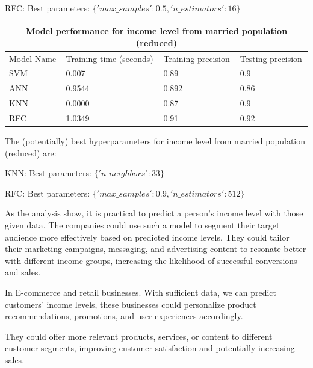 RFC:
Best parameters: $\{'max\_samples': 0.5, 'n\_estimators': 16\}$

\begin{table}[h!]
    \centering
    \begin{tabular}{ |p{3cm}||p{5cm}|p{4cm}|p{4cm}|}
    \hline
    \multicolumn{4}{|c|}{Model performance for income level from married population (reduced)} 
     \\
    \hline
    Model Name& Training time (seconds)& Training precision & Testing precision \\
    \hline
    SVM &0.007   &0.89&0.9\\
    ANN &0.9544  & 0.892 & 0.86\\
    KNN &0.0000 & 0.87&0.9\\
    RFC &1.0349 & 0.91&0.92\\
    \hline
   \end{tabular}
\end{table}

The (potentially) best hyperparameters for income level from married population (reduced) are:

KNN:
Best parameters: $\{'n\_neighbors': 33\}$

RFC:
Best parameters: $\{'max\_samples': 0.9, 'n\_estimators': 512\}$

As the analysis show, it is practical to predict a person's income level with those given data. The companies could use such a model to segment their target audience more effectively based on predicted income levels. They could tailor their marketing campaigns, messaging, and advertising content to resonate better with different income groups, increasing the likelihood of successful conversions and sales.

In E-commerce and retail businesses. With sufficient data, we can predict customers' income levels, these businesses could personalize product recommendations, promotions, and user experiences accordingly.

They could offer more relevant products, services, or content to different customer segments, improving customer satisfaction and potentially increasing sales.


